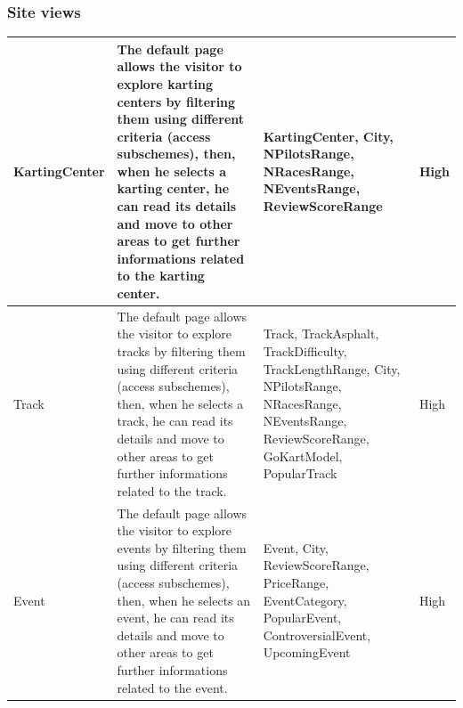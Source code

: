 \documentclass{beamer}
\begin{document}
\begin{frame}
    \frametitle{Site views}
    \begin{table}
        \centering
        \tiny
        \setlength{\tabcolsep}{1pt}
        \begin{tabular}{|m{2cm}|m{4cm}|m{3cm}|m{1cm}|}
        \hline
        KartingCenter & The default page allows the visitor to explore karting centers
        by filtering them using different criteria (access subschemes), then, when he selects a karting center,
        he can read its details and move to other areas to get further informations related to the karting center.
         & KartingCenter, City, NPilotsRange, NRacesRange, NEventsRange, ReviewScoreRange & High \\
        \hline
        Track & The default page allows the visitor to explore tracks
        by filtering them using different criteria (access subschemes), then, when he selects a track,
        he can read its details and move to other areas to get further informations related to the track.
        & Track, TrackAsphalt, TrackDifficulty, TrackLengthRange, City, NPilotsRange, NRacesRange, NEventsRange, ReviewScoreRange,
        GoKartModel, PopularTrack & High \\
        \hline
        Event & The default page allows the visitor to explore events
        by filtering them using different criteria (access subschemes), then, when he selects an event,
        he can read its details and move to other areas to get further informations related to the event.
         & Event, City, ReviewScoreRange, PriceRange, EventCategory, PopularEvent, ControversialEvent, 
        UpcomingEvent & High \\
        \hline
        \end{tabular}
    \end{table}
\end{frame}
\end{document}
